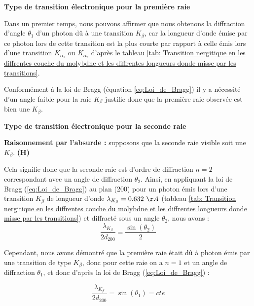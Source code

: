 \begin{flushleft}
	\textbf{Type de transition électronique pour la première raie}	
\end{flushleft}

Dans un premier temps, nous pouvons affirmer que nous obtenons la diffraction d'angle $\theta_1$ d'un photon dû à une transition $K_{\beta}$, car la longueur d'onde émise par ce photon lors de cette transition est la plus courte par rapport à celle émis lors d'une transition $K_{\alpha_1}$ ou $K_{\alpha_2}$ d'après le tableau \ref{tab: Transition nergitique en les diffrentes couche du molybdne et les diffrentes longueurs donde misse par les transitions}.

Conformément à la loi de Bragg (équation \ref{eq:Loi_de_Bragg}) il y a nécessité d'un angle faible pour la raie $K_{\beta}$ justifie donc que la première raie observée est bien une $K_{\beta}$.

\begin{flushleft}
	\textbf{Type de transition électronique pour la seconde raie}	
\end{flushleft}

\textbf{Raisonnement par l'absurde : } supposons que la seconde raie visible soit une $K_{\beta}$. \textbf{(H)} \

\vspace{0.2cm}

Cela signifie donc que la seconde raie est d'ordre de diffraction $n=2$ correspondant avec un angle de diffraction $\theta_2$.
Ainsi, en appliquant la loi de Bragg (\ref{eq:Loi_de_Bragg}) au plan (200) pour un photon émis lors d'une transition $K_{\beta}$ de longueur d'onde $\lambda_{K_{\beta}} = 0.632 \ \AA$ (tableau \ref{tab: Transition nergitique en les diffrentes couche du molybdne et les diffrentes longueurs donde misse par les transitions}) et diffracté sous un angle $\theta_{2}$, nous avons :
\begin{equation} \label{eq: photon K_beta + Bragg}
	\frac{\lambda_{K_{\beta}}}{2d_{200}}=\frac{\sin(\theta_{2})}{2}
\end{equation}

Cependant, nous avons démontré que la première raie était dû à photon émis par une transition de type $K_{\beta}$, donc pour cette raie on a $n=1$ et un angle de diffraction $\theta_{1}$, et donc d'après la loi de Bragg (\ref{eq:Loi_de_Bragg}) :

\begin{equation} \label{eq: constant Bragg}
	\frac{\lambda_{K_{\beta}}}{2d_{200}}=\sin(\theta_{1}) = cte
\end{equation}

